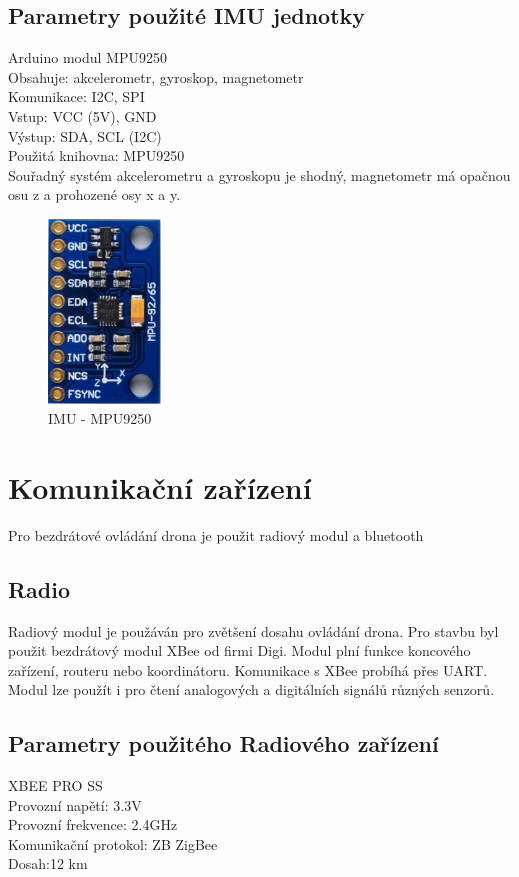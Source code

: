 \subsection{Parametry použité IMU jednotky}
Arduino modul MPU9250\\
Obsahuje: akcelerometr, gyroskop, magnetometr\\
Komunikace: I2C, SPI\\
Vstup: VCC (5V), GND\\
Výstup: SDA, SCL (I2C)\\
Použitá knihovna: MPU9250\\
Souřadný systém akcelerometru a gyroskopu je shodný, magnetometr má opačnou osu z a prohozené osy x a y.

\begin{figure}[h]
	\centering
	\includegraphics[width=3cm]{pictures/imu.jpg}
	\caption{IMU - MPU9250}
\end{figure}
 
\section{Komunikační zařízení} 
Pro bezdrátové ovládání drona je použit radiový modul a bluetooth

\subsection{Radio} 
Radiový modul je použáván pro zvětšení dosahu ovládání drona. Pro stavbu byl použit bezdrátový modul XBee od firmi Digi. Modul plní funkce koncového zařízení, routeru nebo koordinátoru. Komunikace s XBee probíhá přes UART. Modul lze použít i pro čtení analogových a digitálních signálů různých senzorů.

\subsection{Parametry použitého Radiového zařízení}
XBEE PRO SS\\
Provozní napětí: 3.3V\\
Provozní frekvence: 2.4GHz\\
Komunikační protokol: ZB ZigBee\\
Dosah:12 km\\

